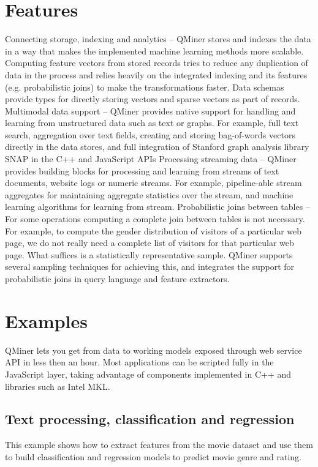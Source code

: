 \documentclass{article} %
\begin{document}
\section{Features}
Connecting storage, indexing and analytics – QMiner stores and indexes the data in a way that makes the implemented machine learning methods more scalable. Computing feature vectors from stored records tries to reduce any duplication of data in the process and relies heavily on the integrated indexing and its features (e.g. probabilistic joins) to make the transformations faster. Data schemas provide types for directly storing vectors and sparse vectors as part of records.
Multimodal data support – QMiner provides native support for handling and learning from unstructured data such as text or graphs. For example, full text search, aggregation over text fields, creating and storing bag-of-words vectors directly in the data stores, and full integration of Stanford graph analysis library SNAP in the C++ and JavaScript APIs
Processing streaming data – QMiner provides building blocks for processing and learning from streams of text documents, website logs or numeric streams. For example, pipeline-able stream aggregates for maintaining aggregate statistics over the stream, and machine learning algorithms for learning from stream.
Probabilistic joins between tables – For some operations computing a complete join between tables is not necessary. For example, to compute the gender distribution of visitors of a particular web page, we do not really need a complete list of visitors for that particular web page. What suffices is a statistically representative sample. QMiner supports several sampling techniques for achieving this, and integrates the support for probabilistic joins in query language and feature extractors.


\section{Examples}
QMiner lets you get from data to working models exposed through web service API in less then an hour. Most applications can be scripted fully in the JavaScript layer, taking advantage of components implemented in C++ and libraries such as Intel MKL.


\subsection{Text processing, classification and regression}

This example shows how to extract features from the movie dataset and use them to build classification and regression models to predict movie genre and rating.
\end{document}
